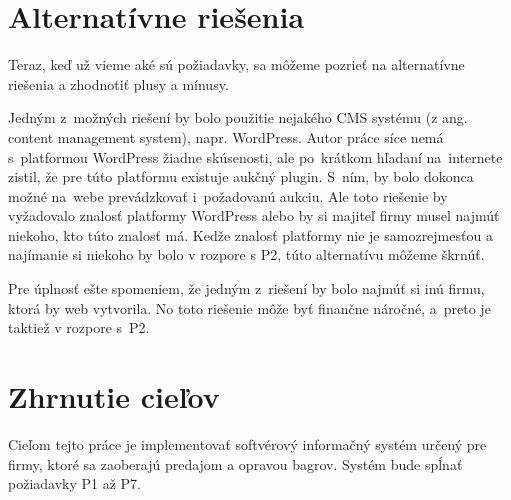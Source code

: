 \section{Alternatívne riešenia}
\label{alternativne riesenia}

Teraz, keď už vieme aké sú požiadavky, sa môžeme pozrieť na alternatívne riešenia a zhodnotiť plusy a mínusy.

Jedným z~možných riešení by bolo použitie nejakého CMS systému (z ang. content management system), napr. WordPress. Autor práce síce nemá s~platformou WordPress žiadne skúsenosti, ale po~krátkom hľadaní na~internete zistil, že pre túto platformu existuje aukčný plugin. S~ním, by bolo dokonca možné na~webe prevádzkovať i~požadovanú aukciu. Ale toto riešenie by vyžadovalo znalosť platformy WordPress alebo by si majiteľ firmy musel najmúť niekoho, kto túto znalosť má. Kedže znalosť platformy nie je samozrejmesťou a najímanie si niekoho by bolo v rozpore s P2, túto alternatívu môžeme škrnúť.

Pre úplnosť ešte spomeniem, že jedným z~riešení by bolo najmúť si inú firmu, ktorá by web vytvorila. No toto riešenie môže byť finančne náročné, a~preto je taktiež v rozpore s~P2.

\section{Zhrnutie cieľov}

Cieľom tejto práce je implementovať softvérový informačný systém určený pre firmy, ktoré sa zaoberajú predajom a opravou bagrov. Systém bude spĺnať požiadavky P1 až P7.
